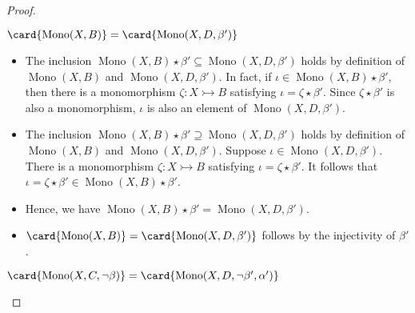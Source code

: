     \begin{proof}
        \label{proof:dcomp_w_u}
    \begin{claim}
        $\card{\operatorname{Mono}(X, B)} = \card{\operatorname{Mono}(X, D, \beta')}$
    \end{claim}
    \begin{itemize} 
        \item The inclusion \(\operatorname{Mono}(X, B) \star \beta' \subseteq \operatorname{Mono}(X, D, \beta')\) holds by definition of $\operatorname{Mono}(X, B)$ and $\operatorname{Mono}(X, D, \beta')$. 
        In fact, if \(\iota  \in \operatorname{Mono}(X, B) \star \beta' \), then there is a monomorphism \(\zeta : X \rightarrowtail B\) satisfying \(\iota = \zeta \star \beta'\). Since $\zeta \star \beta'$ is also a monomorphism, \(\iota\) is also an element of \(\operatorname{Mono}(X, D, \beta')\).
        \item The inclusion \(\operatorname{Mono}(X, B) \star \beta' \supseteq \operatorname{Mono}(X, D, \beta')\) holds by definition of $\operatorname{Mono}(X, B)$ and $\operatorname{Mono}(X, D, \beta')$.
        Suppose \(\iota \in \operatorname{Mono}(X, D, \beta')\). There is a monomorphism \(\zeta : X \rightarrowtail B\) satisfying \(\iota = \zeta \star \beta'\). It follows that \(\iota = \zeta \star \beta' \in \operatorname{Mono}(X, B) \star \beta'\).
        \item Hence, we have \(\operatorname{Mono}(X, B) \star \beta' = \operatorname{Mono}(X, D, \beta')\).
        \item $\card{\operatorname{Mono}(X, B)} = \card{\operatorname{Mono}(X, D, \beta')}$ follows by the injectivity of $\beta'$.
    \end{itemize}
    \begin{claim}
         $\card{\operatorname{Mono}(X, C, \lnot \beta)} = \card{\operatorname{Mono}(X, D, \lnot \beta', \alpha')}$
       \end{claim}
        \begin{itemize}

\end{itemize}
\end{proof}
